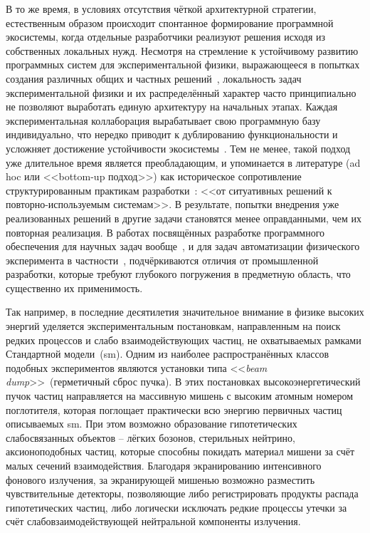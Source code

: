 В то же время, в условиях отсутствия чёткой архитектурной
стратегии, естественным образом происходит спонтанное формирование
программной экосистемы, когда отдельные разработчики реализуют
решения исходя из собственных локальных нужд. Несмотря на стремление к
устойчивому развитию программных систем для экспериментальной физики,
выражающееся в попытках создания различных общих и частных
решений~\cite{gaudi-framework-1, geant4-agostinelli, ROOT-framework, hep-roadmap-Albrecht2019},
локальность задач экспериментальной физики и их распределённый
характер часто принципиально не позволяют выработать единую архитектуру
на начальных этапах. Каждая экспериментальная коллаборация вырабатывает свою
программную базу индивидуально, что нередко приводит к
дублированию функциональности и усложняет достижение устойчивости
экосистемы~\cite{elmer2018strategicplanscientificsoftware}. Тем не менее,
такой подход уже длительное время является преобладающим,
и упоминается в литературе (ad hoc или <<bottom-up подход>>)
как историческое сопротивление структурированным практикам
разработки~\cite{frameworks-Brun2011}: <<от ситуативных решений к
повторно-используемым системам>>. В результате, попытки внедрения уже
реализованных решений в другие задачи становятся менее оправданными, чем
их повторная реализация. В работах посвящённых разработке программного
обеспечения для научных задач вообще~\cite{software-for-science-CarverEtAl2016, lifecycle-lenhardt2014data},
и для задач автоматизации физического эксперимента в частности~\cite{Przedzinski2020PhD},
подчёркиваются отличия от промышленной разработки, которые
требуют глубокого погружения в предметную область, что существенно
их применимость.

Так например, в последние десятилетия значительное внимание в физике высоких
энергий уделяется экспериментальным постановкам, направленным на
поиск редких процессов и слабо взаимодействующих частиц, не
охватываемых рамками Стандартной модели~(\acrshort{sm}). Одним из наиболее
распространённых классов подобных экспериментов являются
установки типа <<\emph{beam dump}>>~(герметичный сброс пучка).
В этих постановках высокоэнергетический пучок частиц
направляется на массивную мишень с высоким атомным номером поглотителя,
которая поглощает практически всю энергию первичных частиц описываемых
\acrshort{sm}. При этом возможно образование гипотетических слабосвязанных
объектов -- лёгких бозонов, стерильных нейтрино, аксионоподобных
частиц, которые способны покидать материал мишени за счёт малых сечений
взаимодействия. Благодаря экранированию интенсивного фонового
излучения, за экранирующей мишенью возможно разместить чувствительные
детекторы, позволяющие либо регистрировать продукты распада гипотетических
частиц, либо логически исключать редкие процессы утечки за счёт
слабовзаимодействующей нейтральной компоненты излучения.


